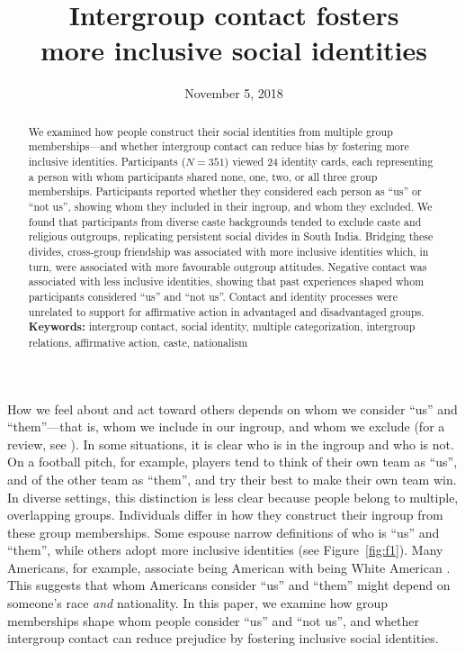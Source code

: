 \documentclass[12pt, a4paper]{article}
\title{Intergroup contact fosters\\more inclusive social identities}
\date{November 5, 2018}
\begin{document}
\maketitle

\begin{abstract}
\noindent We examined how people construct their social identities from multiple group memberships---and whether intergroup contact can reduce bias by fostering more inclusive identities. Participants ($N = 351$) viewed 24 identity cards, each representing a person with whom participants shared none, one, two, or all three group memberships. Participants reported whether they considered each person as ``us'' or ``not us'', showing whom they included in their ingroup, and whom they excluded. We found that participants from diverse caste backgrounds tended to exclude caste and religious outgroups, replicating persistent social divides in South India. Bridging these divides, cross-group friendship was associated with more inclusive identities which, in turn, were associated with more favourable outgroup attitudes. Negative contact was associated with less inclusive identities, showing that past experiences shaped whom participants considered ``us'' and ``not us''. Contact and identity processes were unrelated to support for affirmative action in advantaged and disadvantaged groups.\\[1ex]
\noindent \textbf{Keywords:} intergroup contact, social identity, multiple categorization, intergroup relations, affirmative action, caste, nationalism \\[1ex]
\end{abstract}

\linenumbers

\noindent How we feel about and act toward others depends on whom we consider ``us'' and ``them''---that is, whom we include in our ingroup, and whom we exclude (for a review, see ). In some situations, it is clear who is in the ingroup and who is not. On a football pitch, for example, players tend to think of their own team as ``us'', and of the other team as ``them'', and try their best to make their own team win. In diverse settings, this distinction is less clear because people belong to multiple, overlapping groups. Individuals differ in how they construct their ingroup from these group memberships. Some espouse narrow definitions of who is ``us'' and ``them'', while others adopt more inclusive identities (see Figure~\ref{fig:f1}). Many Americans, for example, associate being American with being White American \cite{devos_american_2005}. This suggests that whom Americans consider ``us'' and ``them'' might depend on someone's race \emph{and} nationality. In this paper, we examine how group memberships shape whom people consider ``us'' and ``not us'', and whether intergroup contact can reduce prejudice by fostering inclusive social identities.
\end{document}

